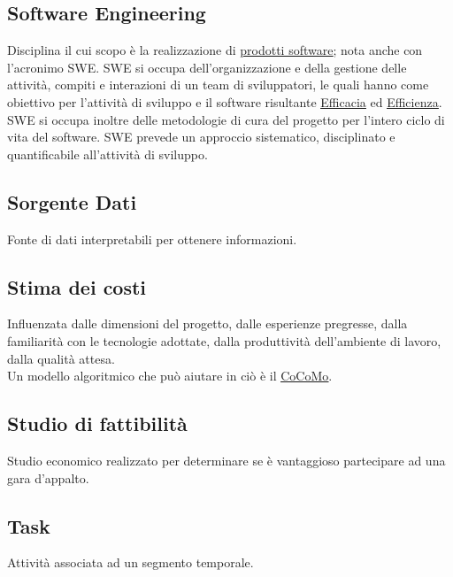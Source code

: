 	\subsection{Software Engineering}
	\label{sec:swe}
	Disciplina il cui scopo è la realizzazione di  \underline{\hyperref[sec:prodottosoftware]{prodotti software}}; nota anche con l'acronimo SWE.
	SWE si occupa dell'organizzazione e della gestione delle attività, compiti e interazioni di un team di sviluppatori,
	le quali hanno come obiettivo per l'attività di sviluppo e il software risultante \underline{\hyperref[sec:efficacia]{Efficacia}} ed \underline{\hyperref[sec:efficienza]{Efficienza}}.
	SWE si occupa inoltre delle metodologie di cura del progetto per l'intero ciclo di vita del software.
	SWE prevede un approccio sistematico, disciplinato e quantificabile all'attività di sviluppo.


	\subsection{Sorgente Dati}
	\label{sec:sorgentedati}
	Fonte di dati interpretabili per ottenere informazioni.


	\subsection{Stima dei costi}
	\label{sec:stimacosti}
	Influenzata dalle dimensioni del progetto, dalle esperienze pregresse, dalla familiarità con le tecnologie adottate, dalla produttività dell'ambiente di lavoro, dalla qualità attesa. \\Un modello algoritmico che può aiutare in ciò è il \underline{\hyperref[sec:cocomo]{CoCoMo}}.


	\subsection{Studio di fattibilità}
	\label{sec:studiofattibilita}
	Studio economico realizzato per determinare se è vantaggioso partecipare ad una gara d'appalto.


	\newpage


	\subsection{Task}
	\label{sec:task}
	Attività associata ad un segmento temporale.


